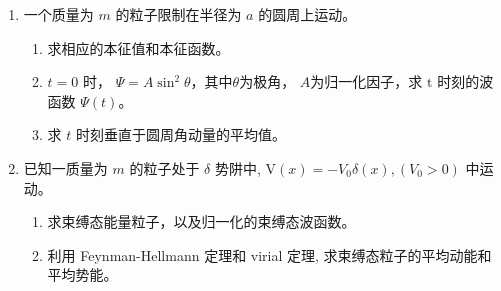 
\begin{enumerate}
	\item
	一个质量为 $m$ 的粒子限制在半径为 $a$ 的圆周上运动。
	\begin{enumerate}
		\item
		求相应的本征值和本征函数。
		\item 
		$t=0$ 时， $\Psi=A \sin ^{2} \theta $，其中$ \theta $为极角， $ A $为归一化因子，求 $\mathrm{t}$ 时刻的波函数 $\Psi(t)$。 
		\item 
		求 $t$ 时刻垂直于圆周角动量的平均值。
		
		
		
	\end{enumerate}



\item 
已知一质量为 $m$ 的粒子处于 $\delta$ 势阱中, $\mathrm{V}(x)=-V_{0} \delta(x),\left(V_{0}>0\right)$ 中运动。
\begin{enumerate}
	\item
	求束缚态能量粒子，以及归一化的束缚态波函数。
	\item 
	利用 Feynman-Hellmann 定理和 virial 定理, 求束缚态粒子的平均动能和平均势能。
	

\end{enumerate}
\end{enumerate}

